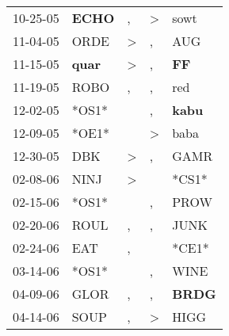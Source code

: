 \begin{supertabular}{p{0.07\textwidth}p{0.06\textwidth}p{0.02\textwidth}p{0.02\textwidth}p{0.06\textwidth}}
          10-25-05\textsuperscript{} &  \textbf{ECHO\textsuperscript{}} &                , &     \textgreater &           sowt\textsuperscript{} \\
          11-04-05\textsuperscript{} &           ORDE\textsuperscript{} &     \textgreater &                , &            AUG\textsuperscript{} \\
          11-15-05\textsuperscript{} &  \textbf{quar\textsuperscript{}} &     \textgreater &                , &    \textbf{FF\textsuperscript{}} \\
          11-19-05\textsuperscript{} &           ROBO\textsuperscript{} &                , &                , &            red\textsuperscript{} \\
          12-02-05\textsuperscript{} &                            *OS1* &                  &                , &  \textbf{kabu\textsuperscript{}} \\
          12-09-05\textsuperscript{} &                            *OE1* &                  &     \textgreater &           baba\textsuperscript{} \\
          12-30-05\textsuperscript{} &            DBK\textsuperscript{} &     \textgreater &                , &           GAMR\textsuperscript{} \\
          02-08-06\textsuperscript{} &           NINJ\textsuperscript{} &     \textgreater &                  &                            *CS1* \\
          02-15-06\textsuperscript{} &                            *OS1* &                  &                , &           PROW\textsuperscript{} \\
          02-20-06\textsuperscript{} &           ROUL\textsuperscript{} &                , &                , &           JUNK\textsuperscript{} \\
          02-24-06\textsuperscript{} &            EAT\textsuperscript{} &                , &                  &                            *CE1* \\
          03-14-06\textsuperscript{} &                            *OS1* &                  &                , &           WINE\textsuperscript{} \\
          04-09-06\textsuperscript{} &           GLOR\textsuperscript{} &                , &                , &  \textbf{BRDG\textsuperscript{}} \\
          04-14-06\textsuperscript{} &           SOUP\textsuperscript{} &                , &     \textgreater &           HIGG\textsuperscript{} \\

\end{supertabular}
